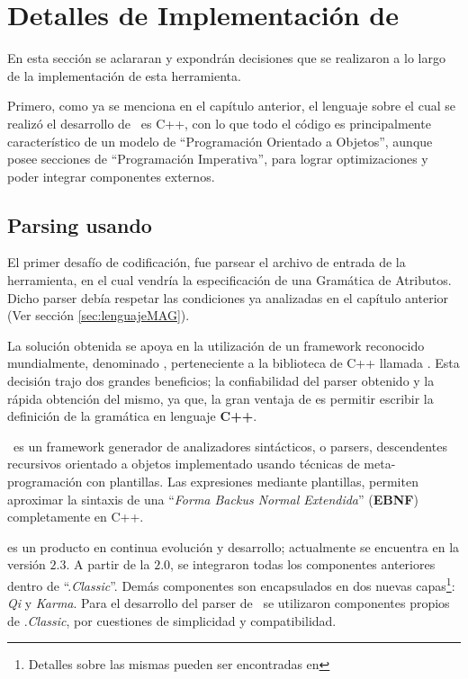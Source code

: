 \chapter{Detalles de Implementación de \maggen}
\label{chap:implem}
\minitoc

En esta sección se aclararan y expondrán decisiones que se realizaron a lo largo de la implementación de esta herramienta.

Primero, como ya se menciona en el capítulo anterior, el lenguaje sobre el cual se realizó el desarrollo de \maggen\ es C++, con lo que todo el código es principalmente característico de un modelo de ``Programación Orientado a Objetos'', aunque posee secciones de ``Programación Imperativa'', para lograr optimizaciones y poder integrar componentes externos.

\section{Parsing usando \boost\ \spirit}
\label{sec:par-spirit}
El primer desafío de codificación, fue parsear el archivo de entrada de la herramienta, en el cual vendría la especificación de una Gramática de Atributos. Dicho parser debía respetar las condiciones ya analizadas en el capítulo anterior (Ver sección \ref{sec:lenguajeMAG}). 

La solución obtenida se apoya en la utilización de un framework reconocido mundialmente, denominado \spirit, perteneciente a la biblioteca de C++ llamada \boost. Esta decisión trajo dos grandes beneficios; la confiabilidad del parser obtenido y la rápida obtención del mismo, ya que, la gran ventaja de \spirit es permitir escribir la definición de la gramática en lenguaje \textbf{C++}.

\spirit\ es un framework generador de analizadores sintácticos, o parsers, descendentes recursivos orientado a objetos implementado usando técnicas de meta-programación con plantillas. Las expresiones mediante plantillas, permiten aproximar la sintaxis de una ``\textit{\textit{Forma Backus Normal Extendida}}'' (\textbf{EBNF}) completamente en C++.

\spirit es un producto en continua evolución y desarrollo; actualmente se encuentra en la versión $2.3$. A partir de la $2.0$, se integraron todas los componentes anteriores dentro de ``\spirit.\textit{Classic}''. Demás componentes son encapsulados en dos nuevas capas\footnote{Detalles sobre las mismas pueden ser encontradas en }: \textit{Qi} y \textit{Karma}. Para el desarrollo del parser de \maggen\ se utilizaron componentes propios de \spirit.\textit{Classic}, por cuestiones de simplicidad y compatibilidad. 

